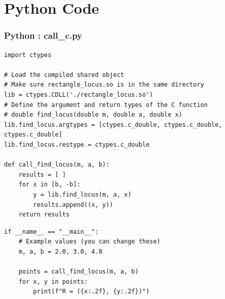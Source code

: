 \documentclass{beamer}
\theoremstyle{remark}
\numberwithin{equation}{section}
\begin{document}
\section{Python Code}
\begin{frame}[fragile]
\frametitle{Python : call\_c.py}
\begin{lstlisting}
import ctypes

# Load the compiled shared object
# Make sure rectangle_locus.so is in the same directory
lib = ctypes.CDLL('./rectangle_locus.so')
# Define the argument and return types of the C function
# double find_locus(double m, double a, double x)
lib.find_locus.argtypes = [ctypes.c_double, ctypes.c_double, ctypes.c_double]
lib.find_locus.restype = ctypes.c_double

def call_find_locus(m, a, b):
    results = [ ]
    for x in [b, -b]:
        y = lib.find_locus(m, a, x)
        results.append((x, y))
    return results
\end{lstlisting}
\end{frame}
\begin{frame}[fragile]
\begin{lstlisting}
if __name__ == "__main__":
    # Example values (you can change these)
    m, a, b = 2.0, 3.0, 4.0

    points = call_find_locus(m, a, b)
    for x, y in points:
        print(f"R = ({x:.2f}, {y:.2f})")

\end{lstlisting}
\end{frame}
\end{document}
